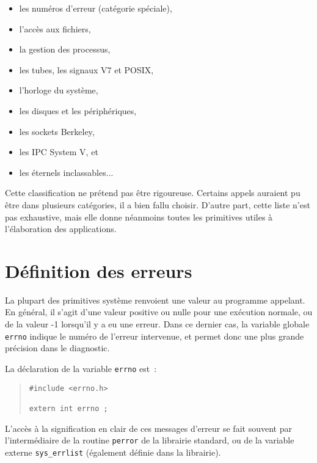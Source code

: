 \documentclass [twoside] {report}
\begin{document}
\begin {itemize}
    \item les numéros d'erreur (catégorie spéciale),
    \item l'accès aux fichiers,
    \item la gestion des processus,
    \item les tubes, les signaux V7 et POSIX,
    \item l'horloge du système,
    \item les disques et les périphériques,
    \item les sockets Berkeley,
    \item les IPC System V, et
    \item les éternels inclassables...
\end {itemize}

Cette classification ne prétend pas être
rigoureuse. Certains appels auraient pu être dans
plusieurs catégories, il a bien fallu choisir.
D'autre part, cette liste n'est pas exhaustive,
mais elle donne néanmoins toutes les primitives
utiles à l'élaboration des applications.




\section {Définition des erreurs}


La plupart des primitives système renvoient une valeur au programme
appelant. En général, il s'agit d'une valeur
positive ou nulle pour une exécution normale, ou
de la valeur -1 lorsqu'il y a eu une erreur. Dans
ce dernier cas, la variable globale {\tt errno}
indique le numéro de l'erreur intervenue, et
permet donc une plus grande précision dans le
diagnostic.

La déclaration de la variable {\tt errno} est~:

\begin {quote}
\begin {verbatim}
#include <errno.h>

extern int errno ;
\end{verbatim}
\end {quote}

L'accès à la signification en clair de ces
messages d'erreur se fait souvent par
l'intermédiaire de la routine {\tt perror} de la
librairie standard, ou de la variable externe
{\tt sys\_errlist} (également définie dans la
librairie).
\end{document}

